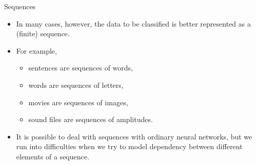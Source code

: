 \documentclass[10pt]{beamer}
\newcommand{\R}{\mathbb{R}}
\begin{document}
\begin{frame}{Sequences}
  \begin{itemize}
\item In many cases, however, the data to be classified is better represented as a (finite) sequence.
\item For example,
  \begin{itemize}
    \item sentences are sequences of words,
    \item words are sequences of letters,
    \item movies are sequences of images,
    \item sound files are sequences of amplitudes.
  \end{itemize}
\item It is possible to deal with sequences with ordinary neural networks, but we run into difficulties when we try to model dependency between different elements of a sequence.
\end{itemize}
\end{frame}
\end{document}

